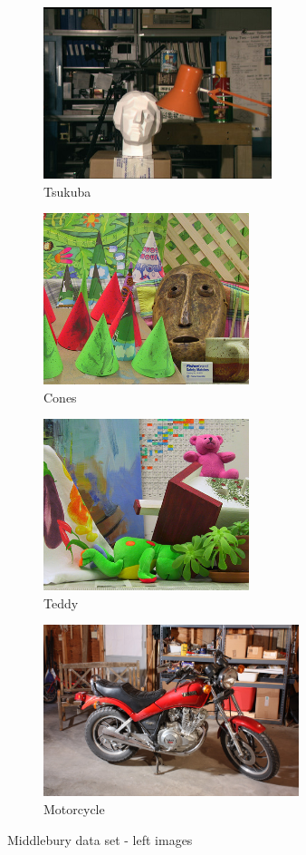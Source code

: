 \begin{figure}[!ht]
  \centering
  \begin{subfigure}[t]{0.45\textwidth}
    \centering\includegraphics[height=5cm]{figures/tsul}
    \caption{Tsukuba \cite{Scharstein2002}\label{fig:tsu}}
  \end{subfigure}\hspace{0.5cm}
  \begin{subfigure}[t]{0.45\textwidth}
    \centering\includegraphics[height=5cm]{figures/conl}
    \caption{Cones \cite{Scharstein2003}\label{fig:cones}}
  \end{subfigure}
  \begin{subfigure}[t]{0.45\textwidth}
    \centering\includegraphics[height=5cm]{figures/tedl}
    \caption{Teddy \cite{Scharstein2003}\label{fig:ted}}
  \end{subfigure}\hspace{0.5cm}
  \begin{subfigure}[t]{0.45\textwidth}
    \centering\includegraphics[height=5cm]{figures/motl}
    \caption{Motorcycle \cite{Scharstein2014}\label{fig:mot}}
  \end{subfigure}
  \caption{Middlebury data set - left images \cite{middlebury2016}\label{fig:middlebury}}
\end{figure}

